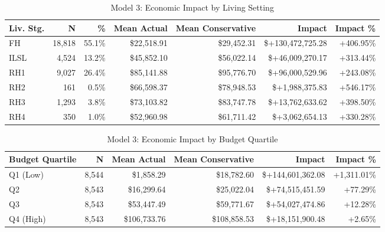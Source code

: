 \begin{table}[htbp]
\centering
\small
\caption{Model 3: Economic Impact by Living Setting}
\label{tab:model3_impact_living}
\begin{tabular}{lrrrrrr}
\toprule
\textbf{Liv. Stg.} & \textbf{N} & \textbf{\%} & \textbf{Mean Actual} & \textbf{Mean Conservative} & \textbf{Impact} & \textbf{Impact \%} \\
\midrule
FH & 18,818 & 55.1\% & \$22,518.91 & \$29,452.31 & \$+130,472,725.28 & +406.95\% \\
ILSL & 4,524 & 13.2\% & \$45,852.10 & \$56,022.14 & \$+46,009,270.17 & +313.44\% \\
RH1 & 9,027 & 26.4\% & \$85,141.88 & \$95,776.70 & \$+96,000,529.96 & +243.08\% \\
RH2 & 161 & 0.5\% & \$66,598.37 & \$78,948.53 & \$+1,988,375.83 & +546.17\% \\
RH3 & 1,293 & 3.8\% & \$73,103.82 & \$83,747.78 & \$+13,762,633.62 & +398.50\% \\
RH4 & 350 & 1.0\% & \$52,960.98 & \$61,711.42 & \$+3,062,654.13 & +330.28\% \\
\bottomrule
\end{tabular}
\end{table}

\begin{table}[htbp]
\centering
\small
\caption{Model 3: Economic Impact by Budget Quartile}
\label{tab:model3_impact_quartile}
\begin{tabular}{lrrrrr}
\toprule
\textbf{Budget Quartile} & \textbf{N} & \textbf{Mean Actual} & \textbf{Mean Conservative} & \textbf{Impact} & \textbf{Impact \%} \\
\midrule
Q1 (Low) & 8,544 & \$1,858.29 & \$18,782.60 & \$+144,601,362.08 & +1,311.01\% \\
Q2 & 8,543 & \$16,299.64 & \$25,022.04 & \$+74,515,451.59 & +77.29\% \\
Q3 & 8,543 & \$53,447.49 & \$59,771.67 & \$+54,027,474.86 & +12.28\% \\
Q4 (High) & 8,543 & \$106,733.76 & \$108,858.53 & \$+18,151,900.48 & +2.65\% \\
\bottomrule
\end{tabular}
\end{table}

